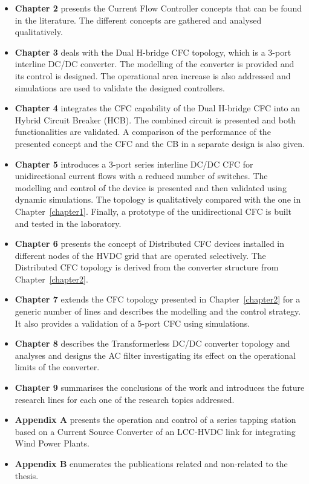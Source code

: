 	
	\begin{itemize}
		\item \textbf{Chapter 2} presents the Current Flow Controller concepts that can be found in the literature. The different concepts are gathered and analysed qualitatively.
		
		\item \textbf{Chapter 3} deals with the Dual H-bridge CFC topology, which is a 3-port interline DC/DC converter. The modelling of the converter is provided and its control is designed. The operational area increase is also addressed and simulations are used to validate the designed controllers.
		
		\item \textbf{Chapter 4} integrates the CFC capability of the Dual H-bridge CFC into an Hybrid Circuit Breaker (HCB). The combined circuit is presented and both functionalities are validated. A comparison of the performance of the presented concept and the CFC and the CB in a separate design is also given.
		
		\item \textbf{Chapter 5} introduces a 3-port series interline DC/DC CFC for unidirectional current flows with a reduced number of switches. The modelling and control of the device is presented and then validated using dynamic simulations. The topology is qualitatively compared with the one in Chapter~\ref{chapter1}. Finally, a prototype of the unidirectional CFC is built and tested in the laboratory.
		
		\item \textbf{Chapter 6} presents the concept of Distributed CFC devices installed in different nodes of the HVDC grid that are operated selectively. The Distributed CFC topology is derived from the converter structure from Chapter~\ref{chapter2}.
				
		\item \textbf{Chapter 7} extends the CFC topology presented in Chapter~\ref{chapter2} for a generic number of lines and describes the modelling and the control strategy. It also provides a validation of a 5-port CFC using simulations.
		
		\item \textbf{Chapter 8} describes the Transformerless DC/DC converter topology and analyses and designs the AC filter investigating its effect on the operational limits of the converter.
		
		\item \textbf{Chapter 9} summarises the conclusions of the work and introduces the future research lines for each one of the research topics addressed.
		
		\item \textbf{Appendix A} presents the operation and control of a series tapping station based on a Current Source Converter of an LCC-HVDC link for integrating Wind Power Plants. 
		
		\item \textbf{Appendix B} enumerates the publications related and non-related to the thesis. 
		
	\end{itemize}


